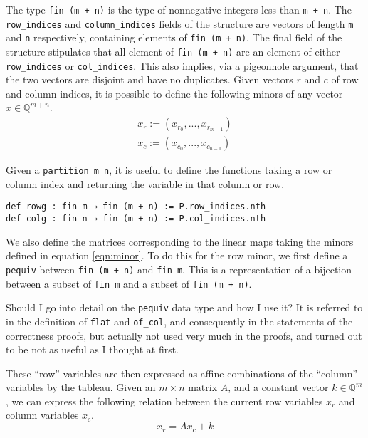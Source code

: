 \documentclass[11pt]{article} %
\begin{document}
The type \verb|fin (m + n)| is the type of nonnegative integers less than \verb|m + n|. The \verb|row_indices| and \verb|column_indices| fields of the structure are vectors of length \verb|m| and \verb|n| respectively, containing elements of \verb|fin (m + n)|. The final field of the structure stipulates that all element of \verb|fin (m + n)| are an element of either \verb|row_indices| or \verb|col_indices|. This also implies, via a pigeonhole argument, that the two vectors are disjoint and have no duplicates. Given vectors $r$ and $c$ of row and column indices, it is possible to define the following minors of any vector $x \in \mathbb{Q}^{m + n}$.
\begin{equation}\label{eqn:minor}
\begin{aligned}
x_r := (x_{r_0}, ... , x_{r_{m-1}}) \\
x_c := (x_{c_0}, ... , x_{c_{n-1}})
\end{aligned}
\end{equation}

Given a \lstinline|partition m n|, it is useful to define the functions taking a row or column index and returning the variable in that column or row.

\begin{lstlisting}[caption = {\lstinline|rowg| and \lstinline|colg| return the variable in a given column or row of a tableau}, captionpos = b]
def rowg : fin m → fin (m + n) := P.row_indices.nth
def colg : fin n → fin (m + n) := P.col_indices.nth
\end{lstlisting}

We also define the matrices corresponding to the linear maps taking the minors defined in equation \ref{eqn:minor}. To do this for the row minor, we first define a \lstinline|pequiv| between \lstinline|fin (m + n)| and \lstinline|fin m|. This is a representation of a bijection between a subset of \lstinline|fin m| and a subset of \lstinline|fin (m + n)|.

\color{red}Should I go into detail on the \lstinline|pequiv| data type and how I use it? It is referred to in the definition of \lstinline|flat| and \lstinline|of_col|, and consequently in the statements of the correctness proofs, but actually not used very much in the proofs, and turned out to be not as useful as I thought at first.\color{black}

These ``row'' variables are then expressed as affine combinations of the ``column'' variables by the tableau. Given an $m \times n$ matrix $A$, and a constant vector $k \in \mathbb{Q}^m$, we can express the following relation between the current row variables $x_r$ and column variables $x_c$.
\begin{equation}\label{eqn:axk}
  x_r = Ax_c + k
\end{equation}
\end{document}
